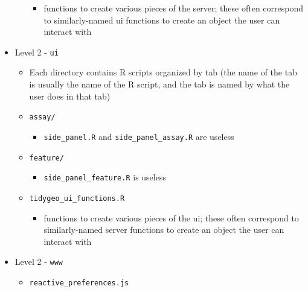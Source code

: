 \documentclass[]{article}
\providecommand{\tightlist}{%
  \setlength{\itemsep}{0pt}\setlength{\parskip}{0pt}}
\begin{document}
\begin{itemize}
\begin{itemize}
    \begin{itemize}
    \tightlist
    \item
      functions to create various pieces of the server; these often
      correspond to similarly-named ui functions to create an object the
      user can interact with
    \end{itemize}
  \end{itemize}
\item
  Level 2 - \texttt{ui}

  \begin{itemize}
  \tightlist
  \item
    Each directory contains R scripts organized by tab (the name of the
    tab is usually the name of the R script, and the tab is named by
    what the user does in that tab)
  \item
    \texttt{assay/}

    \begin{itemize}
    \tightlist
    \item
      \texttt{side\_panel.R} and \texttt{side\_panel\_assay.R} are
      useless
    \end{itemize}
  \item
    \texttt{feature/}

    \begin{itemize}
    \tightlist
    \item
      \texttt{side\_panel\_feature.R} is useless
    \end{itemize}
  \item
    \texttt{tidygeo\_ui\_functions.R}

    \begin{itemize}
    \tightlist
    \item
      functions to create various pieces of the ui; these often
      correspond to similarly-named server functions to create an object
      the user can interact with
    \end{itemize}
  \end{itemize}
\item
  Level 2 - \texttt{www}

  \begin{itemize}
  \tightlist
  \item
    \texttt{reactive\_preferences.js}


\end{itemize}
\end{itemize}
\end{document}
